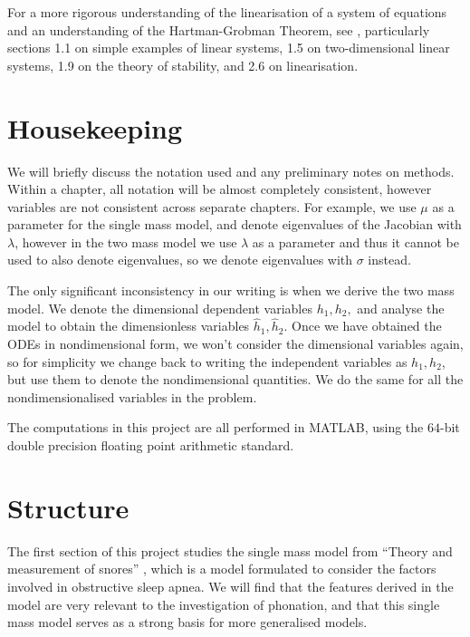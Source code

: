 \documentclass{report}
\begin{document}
For a more rigorous understanding of the linearisation of a system of equations and an understanding of the Hartman-Grobman Theorem,
see \cite{perko_textbook_1996},
particularly sections 1.1 on simple examples of linear systems,
1.5 on two-dimensional linear systems,
1.9 on the theory of stability,
and 2.6 on linearisation.

\section{Housekeeping}

We will briefly discuss the notation used and any preliminary notes on methods.
Within a chapter, all notation will be almost completely consistent,
however variables are not consistent across separate chapters.
For example, we use $\mu$ as a parameter for the single mass model,
and denote eigenvalues of the Jacobian with $\lambda$,
however in the two mass model we use $\lambda$ as a parameter and thus it cannot be used to also denote eigenvalues,
so we denote eigenvalues with $\sigma$ instead.

The only significant inconsistency in our writing is when we derive the two mass model.
We denote the dimensional dependent variables $h_1,h_2,$
and analyse the model to obtain the dimensionless variables $\hat{h}_1,\hat{h}_2.$
Once we have obtained the ODEs in nondimensional form,
we won't consider the dimensional variables again,
so for simplicity we change back to writing the independent variables as $h_1,h_2$,
but use them to denote the nondimensional quantities.
We do the same for all the nondimensionalised variables in the problem.

The computations in this project are all performed in MATLAB,
using the $64$-bit double precision floating point arithmetic standard.

\section{Structure}

The first section of this project studies the single mass model from ``Theory and measurement of snores'' \cite{gavriely_jensen_1993},
which is a model formulated to consider the factors involved in obstructive sleep apnea.
We will find that the features derived in the model are very relevant to the investigation of phonation,
and that this single mass model serves as a strong basis for more generalised models.
\end{document}
